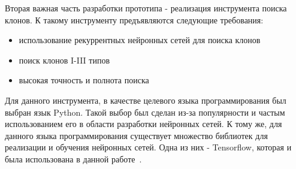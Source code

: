 Вторая важная часть разработки прототипа - реализация инструмента поиска клонов. К такому инструменту предъявляются следующие требования:
\begin{itemize}
\setlength\itemsep{0mm}
\item использование рекуррентных нейронных сетей для поиска клонов
\item поиск клонов I-III типов
\item высокая точность и полнота поиска
\end{itemize}

Для данного инструмента, в качестве целевого языка программирования был выбран язык Python. Такой выбор был сделан из-за популярности и частым использованием его в области разработки нейронных сетей. К тому же, для данного языка программирования существует множество библиотек для реализации и обучения нейронных сетей. Одна из них - Tensorflow, которая и была использована в данной работе~\cite{tf}.
